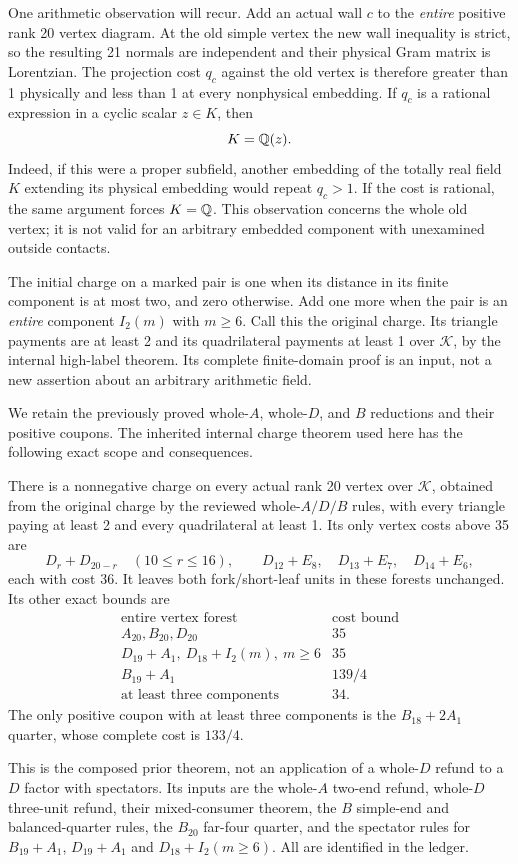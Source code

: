 One arithmetic observation will recur. Add an actual wall $c$ to the
\emph{entire} positive rank 20 vertex diagram. At the old simple vertex
the new wall inequality is strict, so the resulting 21 normals are
independent and their physical Gram matrix is Lorentzian. The projection
cost $q_c$ against the old vertex is therefore greater than 1 physically
and less than 1 at every nonphysical embedding. If $q_c$ is a rational
expression in a cyclic scalar $z\in K$, then
\begin{equation}\label{eq:eight-field}
 K=\mathbb Q(z).
\end{equation}
Indeed, if this were a proper subfield, another embedding of the totally
real field $K$ extending its physical embedding would repeat $q_c>1$.
If the cost is rational, the same argument forces $K=\mathbb Q$.
This observation concerns the whole old vertex; it is not valid for
an arbitrary embedded component with unexamined outside contacts.

The initial charge on a marked pair is one when its distance in its
finite component is at most two, and zero otherwise. Add one more
when the pair is an \emph{entire} component $I_2(m)$ with $m\ge6$.
Call this the original charge. Its triangle payments are at least 2
and its quadrilateral payments at least 1 over $\mathcal K$, by the
internal high-label theorem. Its complete finite-domain proof is an
input, not a new assertion about an arbitrary arithmetic field.

We retain the previously proved whole-$A$, whole-$D$, and $B$ reductions
and their positive coupons. The inherited internal charge theorem used
here has the following exact scope and consequences.
\begin{proposition}\label{prop:eight-old}
There is a nonnegative charge on every actual rank 20 vertex over
$\mathcal K$, obtained from the original charge by the reviewed
whole-$A/D/B$ rules, with every triangle paying at least 2 and every
quadrilateral at least 1. Its only vertex costs above 35 are
\[
 D_r+D_{20-r}\quad(10\le r\le16),\qquad
 D_{12}+E_8,\quad D_{13}+E_7,\quad D_{14}+E_6,
\]
each with cost 36. It leaves both fork/short-leaf units in these forests
unchanged. Its other exact bounds are
\[
\begin{array}{c|c}
 \text{entire vertex forest}&\text{cost bound}\\\hline
 A_{20},B_{20},D_{20}&35\\
 D_{19}+A_1,\ D_{18}+I_2(m),\ m\ge6&35\\
 B_{19}+A_1&139/4\\
 \text{at least three components}&34.
\end{array}
\]
The only positive coupon with at least three components is the
$B_{18}+2A_1$ quarter, whose complete cost is $133/4$.
\end{proposition}
This is the composed prior theorem, not an application of a whole-$D$
refund to a $D$ factor with spectators. Its inputs are the whole-$A$
two-end refund, whole-$D$ three-unit refund, their mixed-consumer
theorem, the $B$ simple-end and balanced-quarter rules, the $B_{20}$
far-four quarter, and the spectator rules for $B_{19}+A_1$,
$D_{19}+A_1$ and $D_{18}+I_2(m\ge6)$. All are identified in the ledger.

